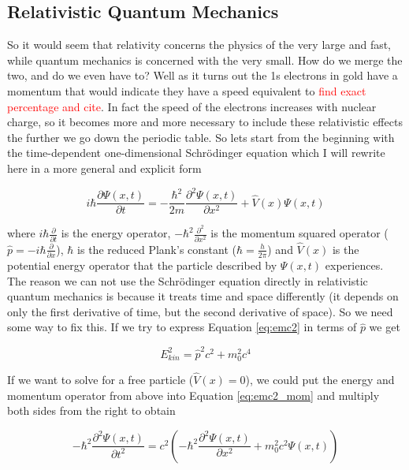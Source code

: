 \documentclass[12pt]{report}
\newcommand{\notetodylan}[1]{\textcolor{red}{#1}} %
\begin{document}
\subsection{Relativistic Quantum Mechanics}
So it would seem that relativity concerns the physics of the very large and fast, while quantum mechanics is concerned with the very small. How do we merge the two, and do we even have to? Well as it turns out the 1s electrons in gold have a momentum that would indicate they have a speed equivalent to \notetodylan{find exact percentage and cite}. In fact the speed of the electrons increases with nuclear charge, so it becomes more and more necessary to include these relativistic effects the further we go down the periodic table. So lets start from the beginning with the time-dependent one-dimensional Schr\"{o}dinger equation which I will rewrite here in a more general and explicit form

\begin{equation}
\label{eq:schr_full}
i\hbar\frac{\partial\Psi(x, t)}{\partial t} = -\frac{\hbar^{2}}{2m}\frac{\partial^{2}\Psi(x, t)}{\partial x^{2}} + \hat{V}(x)\Psi(x, t)
\end{equation}

where $i\hbar\frac{\partial}{\partial t}$ is the energy operator, $-\hbar^{2}\frac{\partial^{2}}{\partial x^{2}}$ is the momentum squared operator ($\hat{p} = -i\hbar\frac{\partial}{\partial x}$), $\hbar$ is the reduced Plank's constant ($\hbar = \frac{h}{2\pi}$) and $\hat{V}(x)$ is the potential energy operator that the particle described by $\Psi(x, t)$ experiences. The reason we can not use the Schr\"{o}dinger equation directly in relativistic quantum mechanics is because it treats time and space differently (it depends on only the first derivative of time, but the second derivative of space). So we need some way to fix this. If we try to express Equation \ref{eq:emc2} in terms of $\hat{p}$ we get

\begin{equation}
\label{eq:emc2_mom}
E_{kin}^{2} = \hat{p}^{2}c^{2} + m_{0}^{2}c^{4}
\end{equation}

If we want to solve for a free particle ($\hat{V}(x) = 0$), we could put the energy and momentum operator from above into Equation \ref{eq:emc2_mom} and multiply both sides from the right to obtain

\begin{equation}
\label{eq:klein-gord_free}
-\hbar^{2}\frac{\partial^{2}\Psi(x,t)}{\partial t^{2}} = c^{2}\left(-\hbar^{2}\frac{\partial^{2}\Psi(x, t)}{\partial x^{2}} + m_{0}^{2}c^{2}\Psi(x,t)\right)
\end{equation}
\end{document}
